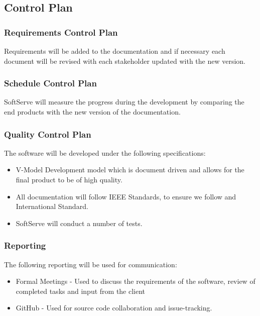 \documentclass[12pt]{article}
\begin{document}
\begin{center}
\begin{longtable}{|p{3cm}|p{3cm}|p{9cm}|}
\end{longtable}
\end{center}

\subsection{Control Plan}
\subsubsection{Requirements Control Plan}
Requirements will be added to the documentation and if necessary each document will be revised with each stakeholder updated with the new version.

\subsubsection{Schedule Control Plan}
SoftServe will measure the progress during the development by comparing the end products with the new version of the documentation.

\subsubsection{Quality Control Plan}
The software will be developed under the following specifications:
\begin{itemize}
\item V-Model Development model which is document driven and allows for the final product to be of high quality.
\item All documentation will follow IEEE Standards, to ensure we follow and International Standard.
\item SoftServe will conduct a number of tests.
\end{itemize}

\subsubsection{Reporting}
The following reporting will be used for communication:
\begin{itemize}
\item Formal Meetings - Used to discuss the requirements of the software, review of completed tasks and input from the client
\item GitHub - Used for source code collaboration and issue-tracking.
\end{itemize}
\end{document}
